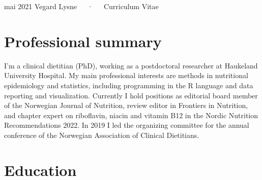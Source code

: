 \documentclass[11pt, a4paper]{awesome-cv}
\begin{document}
\makecvheader

\makecvfooter
  {mai 2021}
    {Vegard Lysne~~~·~~~Curriculum Vitae}
  {\thepage}





\hypertarget{professional-summary}{%
\section{Professional summary}\label{professional-summary}}

I'm a clinical dietitian (PhD), working as a postdoctoral researcher at
Haukeland University Hospital. My main professional interests are
methods in nutritional epidemiology and statistics, including
programming in the R language and data reporting and visualization.
Currently I hold positions as editorial board member of the Norwegian
Journal of Nutrition, review editor in Frontiers in Nutrition, and
chapter expert on riboflavin, niacin and vitamin B12 in the Nordic
Nutrition Recommendations 2022. In 2019 I led the organizing committee
for the annual conference of the Norwegian Association of Clinical
Dietitians.

\hypertarget{education}{%
\section{Education}\label{education}}

\begin{cventries}
\end{cventries}
\end{document}
